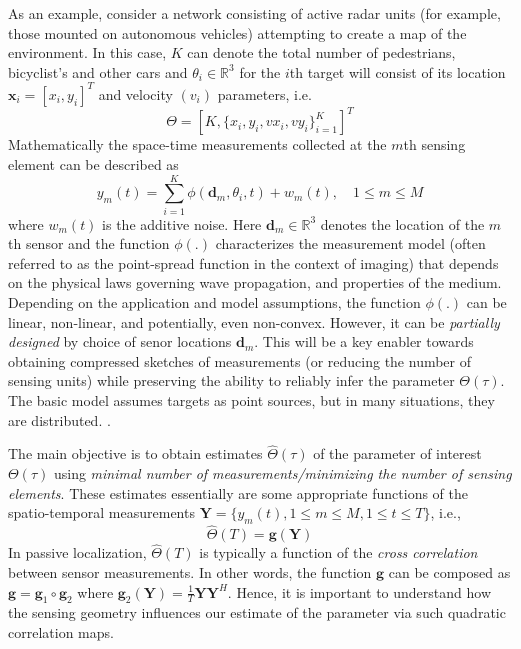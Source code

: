 As an example, consider a network consisting of active radar units (for example, those mounted on autonomous vehicles) attempting to create a map of the environment. In this case, $K$ can denote the total number of pedestrians, bicyclist's and other cars and $\theta_i\in\mathbb{R}^3$ for the $i$th target will consist of its location $\mathbf{x}_i=[x_i,y_i]^T$ and velocity $(v_i)$ parameters, i.e. 
\begin{equation} \Theta = [K, \{x_i, y_i, vx_i ,vy_i\}_{i=1}^K]^T 
\end{equation} 
Mathematically the space-time measurements collected at the $m$th sensing element can be described as 
\begin{equation} 
y_m (t) = \sum_{i=1}^{K} \phi (\mathbf{d}_m,\theta_i,t) + w_m(t), \quad 1\leq m\leq M
\end{equation}
where $w_m(t)$ is the additive noise. Here $\mathbf{d}_m\in \mathbb{R}^3$ denotes the location of the $m$th sensor and the function $\phi(.)$ characterizes the measurement model (often referred to as the point-spread function in the context of imaging) that depends on the physical laws governing wave propagation, and properties of the medium. Depending on the application and model assumptions, the function $\phi(.)$ can be linear, non-linear, and potentially, even non-convex. However, it can be {\em partially designed} by choice of senor locations $\mathbf{d}_m$. This will be a key enabler towards obtaining compressed sketches of measurements (or reducing the number of sensing units) while preserving the ability to reliably infer the parameter $\Theta(\tau)$.\\

The basic model assumes targets as point sources, but in many situations, they are distributed. . 

The main objective is to obtain estimates $\hat\Theta(\tau)$ of the parameter of interest $\Theta (\tau)$ using {\em minimal number of measurements/minimizing the number of sensing elements}. These estimates essentially are some appropriate functions of the spatio-temporal measurements $\mathbf{Y} = \{y_m(t),  1\leq m\leq M, 1\leq t\leq T \}$, i.e., 
\begin{equation}
\hat{\Theta}(T) = \mathbf{g} (\mathbf{Y}) 
\end{equation} 
In passive localization, $\hat{\Theta}(T)$ is typically a function of the {\em cross correlation} between sensor measurements. In other words, the function $\mathbf{g}$ can be composed as $\mathbf{g}=\mathbf{g}_1 \circ \mathbf{g}_2$ where $\mathbf{g}_2(\mathbf{Y})=\frac{1}{T}\mathbf{YY}^{H}$. Hence, it is important to understand how the sensing geometry influences our estimate of the parameter via such quadratic correlation maps.


